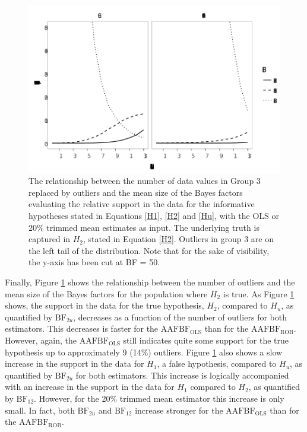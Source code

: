 \documentclass[11pt, a4paper]{article}
\begin{document}
\begin{figure}[p]
\begin{center}
	
	\begin{minipage}{.5\textheight}
	\includegraphics[scale=0.75]{partII_BF_pop2.pdf}
	\caption{The relationship between the number of data values in Group 3
	replaced by outliers and the mean size of the Bayes factors evaluating the 
	relative support in the data for the informative hypotheses stated in 
	Equations \ref{H1}, \ref{H2} and \ref{Hu}, with the OLS or 20\% trimmed mean 
	estimates as input. The underlying truth is captured in $H_2$, stated in 
	Equation \ref{H2}. Outliers in group 3 are on the left tail of the 
	distribution. Note that for the sake of visibility, the y-axis has been cut at 
	BF = 50.}
	\label{Fig: BFpop2}
	\end{minipage}
	
\end{center}
\end{figure}


Finally, Figure \ref{Fig: BFpop2} shows the relationship between the number of outliers and the mean size of the Bayes factors for the population where $H_2$ is true.
As Figure \ref{Fig: BFpop2} shows, the support in the data for the true hypothesis, $H_2$, compared to $H_u$, as quantified by $\mathrm{BF}_{2u}$, decreases as a function of the number of outliers for both estimators. 
This decreases is faster for the $\mathrm{AAFBF_{OLS}}$ than for the $\mathrm{AAFBF_{ROB}}$. 
However, again, the $\mathrm{AAFBF_{OLS}}$ still indicates quite some support for the true hypothesis up to approximately 9 (14\%) outliers.
Figure \ref{Fig: BFpop2} also shows a slow increase in the support in the data for $H_1$, a false hypothesis, compared to $H_u$, as quantified by $\mathrm{BF}_{2u}$ for both estimators. 
This increase is logically accompanied with an increase in the support in the data for $H_1$ compared to $H_2$, as quantified by $\mathrm{BF}_{12}$. 
However, for the 20\% trimmed mean estimator this increase is only small. 
In fact, both $\mathrm{BF}_{2u}$ and $\mathrm{BF}_{12}$ increase stronger for the $\mathrm{AAFBF_{OLS}}$ than for the $\mathrm{AAFBF_{ROB}}$.
\end{document}
